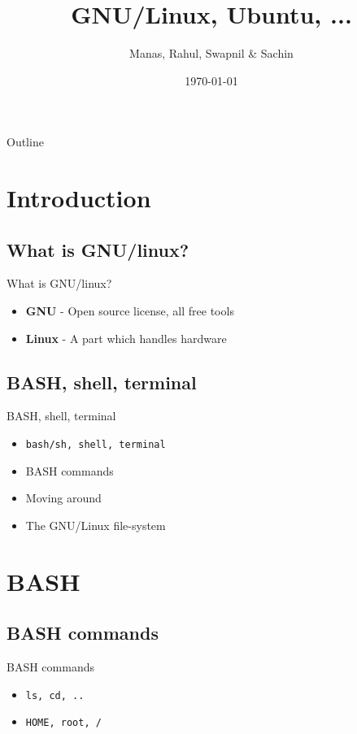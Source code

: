 \documentclass{beamer}
\title[tools]{GNU/Linux, Ubuntu, ...}
\author{Manas, Rahul, Swapnil \& Sachin}
\institute{Indian Institute of Technology, Bombay}
\date{\today}
\begin{document}
\begin{frame}
  \titlepage
\end{frame}
\begin{frame}{Outline}
 \tableofcontents
\end{frame}
\section{Introduction}
\subsection{What is GNU/linux?}
\begin{frame}{What is GNU/linux?}
\begin{itemize}
  \item {\bf GNU} - Open source license, all free tools
  \item {\bf Linux} - A part which handles hardware
\end{itemize}
\end{frame}
\subsection{BASH, shell, terminal}
\begin{frame}{BASH, shell, terminal}
  \begin{itemize}
  \item {\tt bash/sh, shell, terminal}
    \pause
  \item BASH commands
    \pause
  \item Moving around
    \pause
  \item The GNU/Linux file-system
  \end{itemize}
\end{frame}

\section{BASH}
  \subsection{BASH commands}
  \begin{frame}{BASH commands}
    \begin{itemize}
    \item {\tt ls, cd, ..}
      \pause
    \item {\tt HOME, root, /}
    \end{itemize}
  \end{frame}
  
\end{document}
